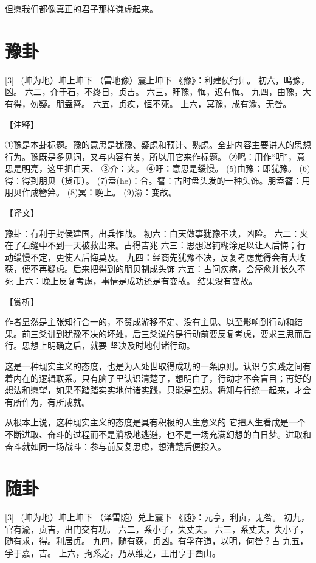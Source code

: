 \documentclass[12pt,UTF8]{ctexbook}
\begin{document}
但愿我们都像真正的君子那样谦虚起来。


\chapter{豫卦}
[3] \ (坤为地）坤上坤下
（雷地豫）震上坤下
《豫》：利建侯行师。
初六，鸣豫，凶。
六二，介于石，不终日，贞吉。
六三，盱豫，悔，迟有悔。
九四，由豫，大有得，勿疑。朋盍簪。
六五，贞疾，恒不死。
上六，冥豫，成有渝。无咎。

【注释】

①豫是本卦标题。豫的意思是犹豫、疑虑和预计、熟虑。全卦内容主要讲人的思想行为。豫既是多见词，又与内容有关，所以用它来作标题。
②鸣：用作“明”，意思是明亮，这里把白天、
③介：夹。
④盱：意思是缓慢。
(5)由豫：即犹豫。
(6)得：得到朋贝（货币）。
(7)盍(he)：合。簪：古时盘头发的一种头饰。朋盍簪：用朋贝作成簪笄。
(8)冥：晚上。
(9)渝：变故。

【译文】

豫卦：有利于封侯建国，出兵作战。
初六：白天做事犹豫不决，凶险。
六二：夹在了石缝中不到一天被救出来。占得吉兆
六三：思想迟钝糊涂足以让人后悔；行动缓慢不定，更使人后悔莫及。
九四：经商先犹豫不决，反复考虑觉得会有大收获，便不再疑虑。后来把得到的朋贝制成头饰
六五：占问疾病，会痊愈并长久不死
上六：晚上反复考虑，事情是成功还是有变故。 结果没有变故。

【赏析】

作者显然是主张知行合一的，不赞成游移不定、没有主见、以至影响到行动和结果。前三爻讲到犹豫不决的坏处，后三爻说的是行动前要反复考虑，要求三思而后行。思想上明确之后，就要 坚决及时地付诸行动。

这是一种现实主义的态度，也是为人处世取得成功的一条原则。认识与实践之间有着内在的逻辑联系。只有脑子里认识清楚了，想明白了，行动才不会盲目；再好的想法和愿望，如果不踏踏实实地付诸实践，只能是空想。将知与行统一起来，才会有所作为，有所成就。

从根本上说，这种现实主义的态度是具有积极的人生意义的 它把人生看成是一个不断进取、奋斗的过程而不是消极地逃避，也不是一场充满幻想的白日梦。进取和奋斗就如同一场战斗：参与前反复思虑，想清楚后便投入。

\chapter{随卦}
[3] \ (坤为地）坤上坤下
（泽雷随）兑上震下
《随》：元亨，利贞，无咎。
初九，官有渝，贞吉，出门交有功。
六二，系小子，失丈夫。
六三，系丈夫，失小子，随有求，得。利居贞。
九四，随有获，贞凶。有孚在道，以明，何咎？古
九五，孚于嘉，吉。
上六，拘系之，乃从维之，王用亨于西山。
\end{document}
